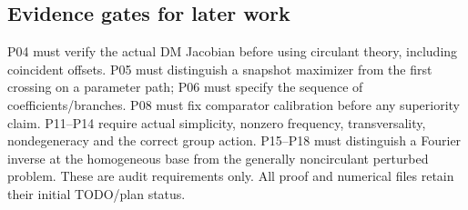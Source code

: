 \subsection{Evidence gates for later work}
P04 must verify the actual DM Jacobian before using circulant
theory, including coincident offsets. P05 must distinguish a
snapshot maximizer from the first crossing on a parameter path;
P06 must specify the sequence of coefficients/branches.
P08 must fix comparator calibration before any superiority
claim. P11--P14 require actual simplicity, nonzero frequency,
transversality, nondegeneracy and the correct group action.
P15--P18 must distinguish a Fourier inverse at the homogeneous
base from the generally noncirculant perturbed problem.
These are audit requirements only. All proof and numerical
files retain their initial TODO/plan status.
